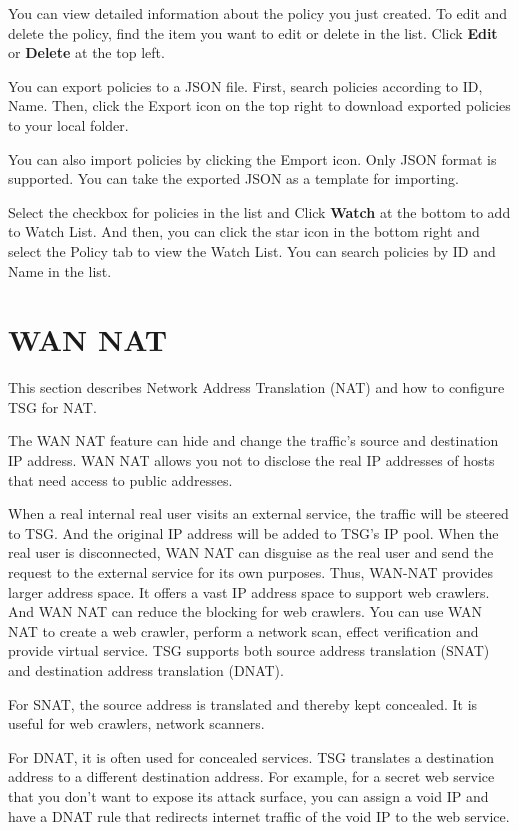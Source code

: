 You can view detailed information about the policy you just created. To edit and delete the policy, find the item you want to edit or delete in the list. Click \textbf{Edit} or \textbf{Delete} at the top left.


You can export policies to a JSON file. First, search policies according to ID, Name. Then, click the Export icon on the top right to download exported policies to your local folder.

You can also import policies by clicking the Emport icon. Only JSON format is supported. You can take the exported JSON as a template for importing.


Select the checkbox for policies in the list and Click \textbf{Watch} at the bottom to add to Watch List. And then, you can click the star icon in the bottom right and select the Policy tab to view the Watch List. You can search policies by ID and Name in the list.

\section*{\hypertarget{link:WAN NAT}{WAN NAT}}
\label{sec:policies:wannat}

This section describes Network Address Translation (NAT) and how to configure TSG for NAT. 


The WAN NAT feature can hide and change the traffic’s source and destination IP address. WAN NAT allows you not to disclose the real IP addresses of hosts 
that need access to public addresses. 


When a real internal real user visits an external service, the traffic will be steered to TSG. And the original IP address will be added to TSG’s IP pool. 
When the real user is disconnected, WAN NAT can disguise as the real user and send the request to the external service for its own purposes. 
Thus, WAN-NAT provides larger address space. It offers a vast IP address space to support web crawlers. 
And WAN NAT can reduce the blocking for web crawlers. You can use WAN NAT to create a web crawler, perform a network scan, effect verification and provide virtual service. 
TSG supports both source address translation (SNAT) and destination address translation (DNAT). 

For SNAT, the source address is translated and thereby kept concealed. It is useful for web crawlers, network scanners.

For DNAT, it is often used for concealed services. TSG translates a destination address to a different destination address. For example, for a secret web service that you don't want to expose its attack surface, you can assign a void IP and have a DNAT rule that redirects internet traffic of the void IP to the web service.

